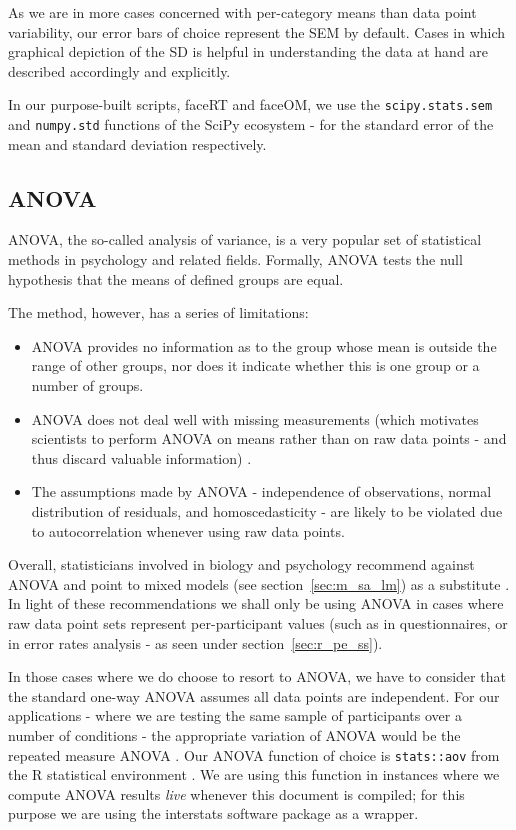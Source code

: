 	    As we are in more cases concerned with per-category means than data point variability, our error bars of choice represent the SEM by default.
	    Cases in which graphical depiction of the SD is helpful in understanding the data at hand are described accordingly and explicitly.
	    
	    In our purpose-built scripts, faceRT\citep{faceRT} and faceOM\citep{faceOM}, we use the \colorbox{vlg}{\texttt{scipy.stats.sem}} and \colorbox{vlg}{\texttt{numpy.std}} functions of the SciPy ecosystem \citep{scipy,Oliphant2007} -
	    for the standard error of the mean and standard deviation respectively.
	\subsection{ANOVA}\label{sec:m_sa_a}
	    ANOVA, the so-called analysis of variance, is a very popular set of statistical methods in psychology and related fields.
	    Formally, ANOVA tests the null hypothesis that the means of defined groups are equal.
	    
	    The method, however, has a series of limitations:
	    \begin{itemize}
		\item ANOVA provides no information as to the group whose mean is outside the range of other groups, nor does it indicate whether this is one group or a number of groups.
		\item ANOVA does not deal well with missing measurements (which motivates scientists to perform ANOVA on means rather than on raw data points - and thus discard valuable information) \citep{Gueorguieva2004}.
		\item The assumptions made by ANOVA - independence of observations, normal distribution of residuals, and homoscedasticity \citep{Anderson1996} - are likely to be violated due to autocorrelation whenever using raw data points. 
	    \end{itemize}
	    Overall, statisticians involved in biology and psychology recommend against ANOVA and point to mixed models (see section~\ref{sec:m_sa_lm}) as a substitute \citep{Baayen2008,Gueorguieva2004}. 
	    In light of these recommendations we shall only be using ANOVA in cases where raw data point sets represent per-participant values 
	    (such as in questionnaires, or in error rates analysis - as seen under section~\ref{sec:r_pe_ss}).
	    
	    In those cases where we do choose to resort to ANOVA, we have to consider that the standard one-way ANOVA assumes all data points are independent.
	    For our applications - where we are testing the same sample of participants over a number of conditions - the appropriate variation of ANOVA would be the repeated measure ANOVA \citep{Gueorguieva2004}.
	    Our ANOVA function of choice is \colorbox{vlg}{\texttt{stats::aov}} \citep{Chambers1992} from the R statistical environment \citep{R}.
	    We are using this function in instances where we compute ANOVA results \textit{live} whenever this document is compiled; for this purpose we are using the interstats\citep{interstats} software package as a wrapper.
	    
